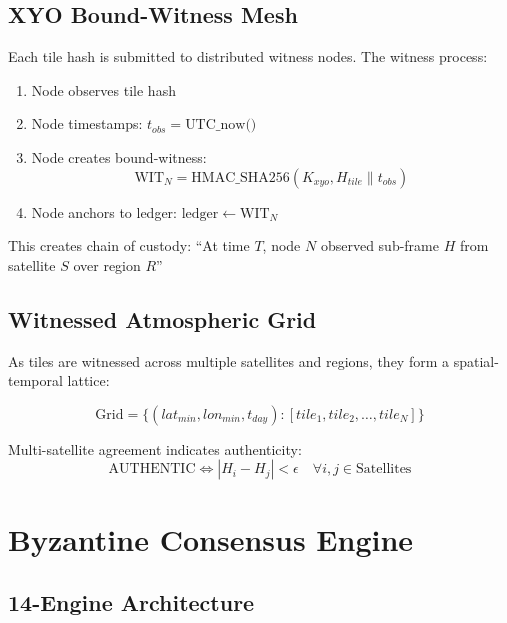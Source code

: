 \documentclass[11pt]{article}
\begin{document}
\subsection{XYO Bound-Witness Mesh}

Each tile hash is submitted to distributed witness nodes. The witness process:

\begin{enumerate}
    \item Node observes tile hash
    \item Node timestamps: $t_{obs} = \text{UTC\_now()}$
    \item Node creates bound-witness: 
    \begin{equation}
    \text{WIT}_N = \text{HMAC\_SHA256}(K_{xyo}, H_{tile} \| t_{obs})
    \end{equation}
    \item Node anchors to ledger: $\text{ledger} \leftarrow \text{WIT}_N$
\end{enumerate}

This creates chain of custody: ``At time $T$, node $N$ observed sub-frame $H$ from satellite $S$ over region $R$''

\subsection{Witnessed Atmospheric Grid}

As tiles are witnessed across multiple satellites and regions, they form a spatial-temporal lattice:

\begin{equation}
\text{Grid} = \{(lat_{min}, lon_{min}, t_{day}): [tile_1, tile_2, \ldots, tile_N]\}
\end{equation}

Multi-satellite agreement indicates authenticity:
\begin{equation}
\text{AUTHENTIC} \iff |H_i - H_j| < \epsilon \quad \forall i,j \in \text{Satellites}
\end{equation}

\section{Byzantine Consensus Engine}

\subsection{14-Engine Architecture}
\end{document}
